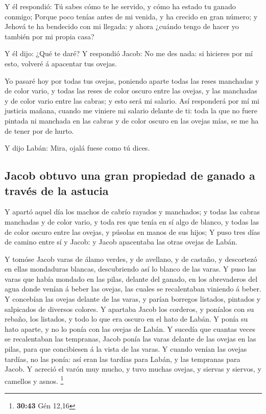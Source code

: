  Y él respondió: Tú sabes cómo te he servido, y cómo ha
estado tu ganado conmigo;  Porque poco tenías antes de mi
venida, y ha crecido en gran número; y Jehová te ha bendecido con mi
llegada: y ahora ¿cuándo tengo de hacer yo también por mi propia casa?

 Y él dijo: ¿Qué te daré? Y respondió Jacob: No me des
nada: si hicieres por mí esto, volveré á apacentar tus ovejas.

 Yo pasaré hoy por todas tus ovejas, poniendo aparte
todas las reses manchadas y de color vario, y todas las reses de color
oscuro entre las ovejas, y las manchadas y de color vario entre las
cabras; y esto será mi salario.  Así responderá por mí mi
justicia mañana, cuando me viniere mi salario delante de ti: toda la que
no fuere pintada ni manchada en las cabras y de color oscuro en las
ovejas mías, se me ha de tener por de hurto.

 Y dijo Labán: Mira, ojalá fuese como tú dices.

\hypertarget{jacob-obtuvo-una-gran-propiedad-de-ganado-a-travuxe9s-de-la-astucia}{%
\subsection{Jacob obtuvo una gran propiedad de ganado a través de la
astucia}\label{jacob-obtuvo-una-gran-propiedad-de-ganado-a-travuxe9s-de-la-astucia}}

 Y apartó aquel día los machos de cabrío rayados y
manchados; y todas las cabras manchadas y de color vario, y toda res que
tenía en sí algo de blanco, y todas las de color oscuro entre las
ovejas, y púsolas en manos de sus hijos;  Y puso tres
días de camino entre sí y Jacob: y Jacob apacentaba las otras ovejas de
Labán.

 Y tomóse Jacob varas de álamo verdes, y de avellano, y
de castaño, y descortezó en ellas mondaduras blancas, descubriendo así
lo blanco de las varas.  Y puso las varas que había
mondado en las pilas, delante del ganado, en los abrevaderos del agua
donde venían á beber las ovejas, las cuales se recalentaban viniendo á
beber.  Y concebían las ovejas delante de las varas, y
parían borregos listados, pintados y salpicados de diversos colores.
 Y apartaba Jacob los corderos, y poníalos con su rebaño,
los listados, y todo lo que era oscuro en el hato de Labán. Y ponía su
hato aparte, y no lo ponía con las ovejas de Labán.  Y
sucedía que cuantas veces se recalentaban las tempranas, Jacob ponía las
varas delante de las ovejas en las pilas, para que concibiesen á la
vista de las varas.  Y cuando venían las ovejas tardías,
no las ponía: así eran las tardías para Labán, y las tempranas para
Jacob.  Y acreció el varón muy mucho, y tuvo muchas
ovejas, y siervas y siervos, y camellos y asnos. \footnote{\textbf{30:43}
  Gén 12,16}

